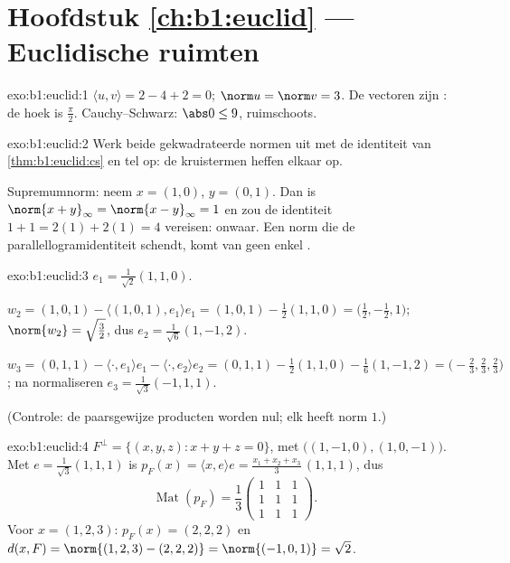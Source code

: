 \section*{Hoofdstuk \ref{ch:b1:euclid} --- Euclidische ruimten}

\begin{solution}{exo:b1:euclid:1}
$\langle u, v\rangle = 2 - 4 + 2 = 0$; $\norm u = \norm v = 3$. De
vectoren zijn : de hoek is $\frac\pi2$. Cauchy--Schwarz:
$\abs 0 \leq 9$, ruimschoots.
\end{solution}

\begin{solution}{exo:b1:euclid:2}
Werk beide gekwadrateerde normen uit met de identiteit van
\cref{thm:b1:euclid:cs} en tel op: de kruistermen heffen elkaar op.

Supremumnorm: neem $x = (1, 0)$, $y = (0, 1)$. Dan is $\norm{x +
y}_\infty = \norm{x - y}_\infty = 1$ en zou de identiteit $1 + 1 =
2(1) + 2(1) = 4$ vereisen: onwaar. Een norm die de
parallellogramidentiteit schendt, komt van geen enkel .
\end{solution}

\begin{solution}{exo:b1:euclid:3}
$e_1 = \frac{1}{\sqrt 2}(1,1,0)$.

$w_2 = (1,0,1) - \langle (1,0,1), e_1\rangle e_1 = (1,0,1) -
\frac{1}{2}(1,1,0) = \bigl(\tfrac12, -\tfrac12, 1\bigr)$;
$\norm{w_2} = \sqrt{\tfrac32}$, dus $e_2 = \frac{1}{\sqrt 6}(1, -1,
2)$.

$w_3 = (0,1,1) - \langle\cdot, e_1\rangle e_1 - \langle\cdot,
e_2\rangle e_2 = (0,1,1) - \frac12 (1,1,0) - \frac16(1,-1,2) =
\bigl(-\tfrac23, \tfrac23, \tfrac23\bigr)$; na normaliseren $e_3 =
\frac{1}{\sqrt 3}(-1, 1, 1)$.

(Controle: de paarsgewijze producten worden nul; elk heeft norm
$1$.)
\end{solution}

\begin{solution}{exo:b1:euclid:4}
$F^\perp = \{(x,y,z) : x + y + z = 0\}$, met  $\bigl((1,-1,0),
(1,0,-1)\bigr)$. Met $e = \frac{1}{\sqrt3}(1,1,1)$ is $p_F(x) =
\langle x, e\rangle e = \frac{x_1 + x_2 + x_3}{3}\,(1,1,1)$, dus
\[
\operatorname{Mat}(p_F) = \frac13
\begin{pmatrix} 1&1&1\\ 1&1&1\\ 1&1&1\end{pmatrix}.
\]
Voor $x = (1,2,3)$: $p_F(x) = (2,2,2)$ en $d(x, F) = \norm{(1,2,3)
- (2,2,2)} = \norm{(-1,0,1)} = \sqrt 2$.
\end{solution}

